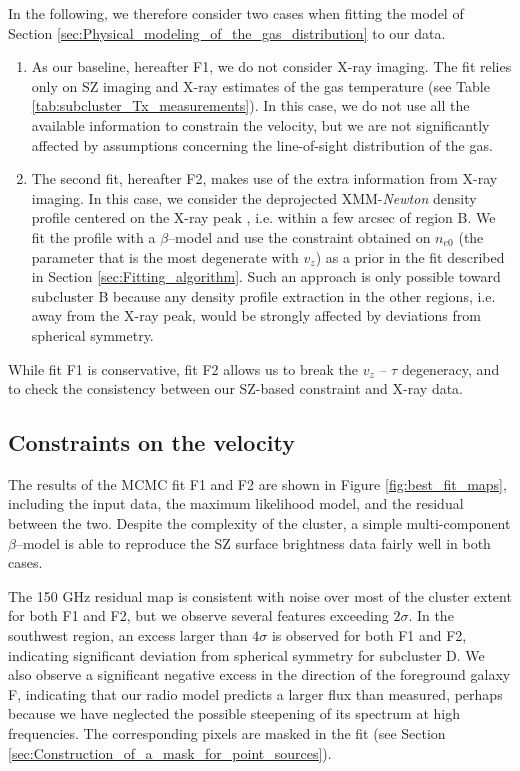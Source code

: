 \documentclass[twocolumn,traditabstract]{aa}
\begin{document}
In the following, we therefore consider two cases when fitting the model of Section \ref{sec:Physical_modeling_of_the_gas_distribution} to our data.
\begin{enumerate}
\item As our baseline, hereafter F1, we do not consider X-ray imaging. The fit relies only on SZ imaging and X-ray estimates of the gas temperature (see Table \ref{tab:subcluster_Tx_measurements}). In this case, we do not use all the available information to constrain the velocity, but we are not significantly affected by assumptions concerning the line-of-sight distribution of the gas.
\item The second fit, hereafter F2, makes use of the extra information from X-ray imaging. In this case, we consider the deprojected XMM-\textit{Newton} density profile centered on the X-ray peak \citep[extracted as in][]{Adam2016}, i.e. within a few arcsec of region B. We fit the profile with a $\beta$--model and use the constraint obtained on $n_{e0}$ (the parameter that is the most degenerate with $v_z$) as a prior in the fit described in Section \ref{sec:Fitting_algorithm}. Such an approach is only possible toward subcluster B because any density profile extraction in the other regions, i.e. away from the X-ray peak, would be strongly affected by deviations from spherical symmetry.
\end{enumerate}
While fit F1 is conservative, fit F2 allows us to break the $v_z$ -- $\tau$ degeneracy, and to check the consistency between our SZ-based constraint and X-ray data.

\subsection{Constraints on the velocity}\label{sec:Constraints_on_the_velocity}
The results of the MCMC fit F1 and F2 are shown in Figure \ref{fig:best_fit_maps}, including the input data, the maximum likelihood model, and the residual between the two. Despite the complexity of the cluster, a simple multi-component $\beta$--model is able to reproduce the SZ surface brightness data fairly well in both cases.

The 150 GHz residual map is consistent with noise over most of the cluster extent for both F1 and F2, but we observe several features exceeding $2 \sigma$. In the southwest region, an excess larger than $4 \sigma$ is observed for both F1 and F2, indicating significant deviation from spherical symmetry for subcluster D. We also observe a significant negative excess in the direction of the foreground galaxy F, indicating that our radio model predicts a larger flux than measured, perhaps because we have neglected the possible steepening of its spectrum at high frequencies. The corresponding pixels are masked in the fit (see Section \ref{sec:Construction_of_a_mask_for_point_sources}).
\end{document}
